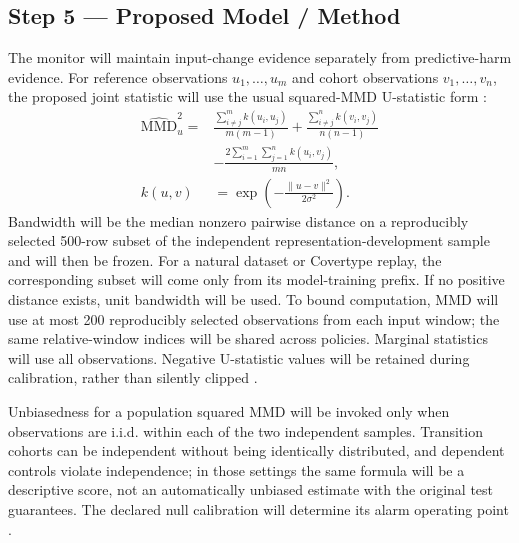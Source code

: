 \subsection*{Step 5 --- Proposed Model / Method}
The monitor will maintain input-change evidence separately from predictive-harm evidence. For reference observations $u_1,\ldots,u_m$ and cohort observations $v_1,\ldots,v_n$, the proposed joint statistic will use the usual squared-MMD U-statistic form \cite{gretton}:
\begin{align}
\widehat{\mathrm{MMD}}_u^2={}&\frac{\sum_{i\ne j}^{m} k(u_i,u_j)}{m(m-1)}
+\frac{\sum_{i\ne j}^{n} k(v_i,v_j)}{n(n-1)}\\
&-\frac{2\sum_{i=1}^{m}\sum_{j=1}^{n}k(u_i,v_j)}{mn},\nonumber\\
k(u,v)&=\exp\!\left(-\frac{\|u-v\|^2}{2\sigma^2}\right).
\end{align}
Bandwidth will be the median nonzero pairwise distance on a reproducibly selected 500-row subset of the independent representation-development sample and will then be frozen. For a natural dataset or Covertype replay, the corresponding subset will come only from its model-training prefix. If no positive distance exists, unit bandwidth will be used. To bound computation, MMD will use at most 200 reproducibly selected observations from each input window; the same relative-window indices will be shared across policies. Marginal statistics will use all observations. Negative U-statistic values will be retained during calibration, rather than silently clipped \cite{gretton}.

Unbiasedness for a population squared MMD will be invoked only when observations are i.i.d. within each of the two independent samples. Transition cohorts can be independent without being identically distributed, and dependent controls violate independence; in those settings the same formula will be a descriptive score, not an automatically unbiased estimate with the original test guarantees. The declared null calibration will determine its alarm operating point \cite{gretton}.


